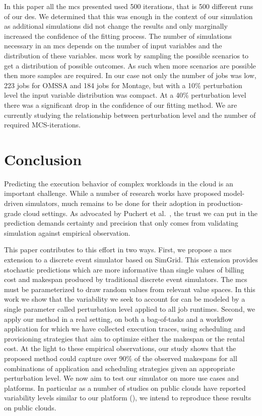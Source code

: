 \documentclass[10pt,conference,compsocconf]{IEEEtran}
\begin{document}
In this paper all the \ac{mcs} presented used 500 iterations, that is 500
different runs of our \ac{des}. We determined that this was enough in the
context of our simulation as additional simulations did not change the results
and only marginally increased the confidence of the fitting process. The number
of simulations necessary in an \ac{mcs} depends on the number of input variables
and the distribution of these variables. \aclp{mcs} work by sampling the possible
scenarios to get a distribution of possible outcomes. As such when more scenarios are
possible then more samples are required. In our case not only the number of jobs
was low, 223 jobs for OMSSA and 184 jobs for Montage, but with a 10\%
perturbation level the input variable distribution was compact. At a 40\%
perturbation level there was a significant drop in the confidence of our fitting
method. We are currently studying the relationship between perturbation level
and the number of required MCS-iterations.

\section{Conclusion}
Predicting  the execution  behavior  of complex  workloads in  the  cloud is  an
important challenge. While a number of research works have proposed model-driven
simulators, much remains to be done for their adoption in production-grade cloud
settings. As  advocated by Puchert  et al.~\cite{PucherGWK15}, the trust  we can
put in  the prediction  demands certainty  and precision  that only  comes from
validating simulation against empirical observation.

This paper contributes to this effort in two ways. First, we propose a \acl{mcs}
extension  to a  discrete  event  simulator based  on  SimGrid.  This  extension
provides stochastic predictions which are more informative than single values of
billing cost  and makespan  produced by  traditional discrete  event simulators.
The \acl{mcs}  must be parameterized to  draw random values from  relevant value
spaces. In this work we show that the  variability we seek to account for can be
modeled  by a  single parameter  called perturbation  level applied  to all  job
runtimes. Second, we apply our method in  a real setting, on both a bag-of-tasks
and a workflow  application for which we have collected  execution traces, using
scheduling and provisioning strategies that  aim to optimize either the makespan
or the  rental cost.  At  the light to  these empirical observations,  our study
shows that the proposed method could capture over 90\% of the observed makespans
for  all  combinations  of  application   and  scheduling  strategies  given  an
appropriate perturbation  level.  We now aim  to test our simulator  on more use
cases and platforms.  In particular as a number of studies on public clouds have
reported variability levels similar to our platform (\cite{LeitnerC16,pics}), we
intend to reproduce these results on public clouds.










\newpage
\end{document}
